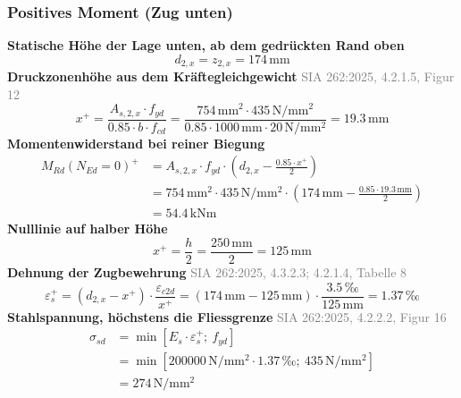 \documentclass[11pt,a4paper]{article}
\newcommand{\normref}[1]{{\small\textcolor{gray}{#1}}}
\begin{document}
\subsubsection{Positives Moment (Zug unten)}
\noindent\textbf{Statische Höhe der Lage unten, ab dem gedrückten Rand oben}
\begin{equation*}
d_{2,x} = z_{2,x} = 174\,\mathrm{mm}
\end{equation*}
\noindent\textbf{Druckzonenhöhe aus dem Kräftegleichgewicht} \hfill \normref{SIA 262:2025, 4.2.1.5, Figur 12}
\begin{equation*}
x^{+} = \frac{A_{s,2,x} \cdot f_{yd}}{0.85 \cdot b \cdot f_{cd}} = \frac{754\,\mathrm{mm}^{2} \cdot 435\,\mathrm{N}/\mathrm{mm}^{2}}{0.85 \cdot 1000\,\mathrm{mm} \cdot 20\,\mathrm{N}/\mathrm{mm}^{2}} = 19.3\,\mathrm{mm}
\end{equation*}
\noindent\textbf{Momentenwiderstand bei reiner Biegung}
\begin{equation*}
\begin{aligned}
  M_{Rd}(N_{Ed}=0)^{+} &= A_{s,2,x} \cdot f_{yd} \cdot \left(d_{2,x} - \frac{0.85 \cdot x^{+}}{2}\right) \\
  &= 754\,\mathrm{mm}^{2} \cdot 435\,\mathrm{N}/\mathrm{mm}^{2} \cdot \left(174\,\mathrm{mm} - \frac{0.85 \cdot 19.3\,\mathrm{mm}}{2}\right) \\
  &= 54.4\,\mathrm{kNm}
\end{aligned}
\end{equation*}
\noindent\textbf{Nulllinie auf halber Höhe}
\begin{equation*}
x^{+} = \frac{h}{2} = \frac{250\,\mathrm{mm}}{2} = 125\,\mathrm{mm}
\end{equation*}
\noindent\textbf{Dehnung der Zugbewehrung} \hfill \normref{SIA 262:2025, 4.3.2.3; 4.2.1.4, Tabelle 8}
\begin{equation*}
\varepsilon_s^{+} = \left(d_{2,x} - x^{+}\right) \cdot \frac{\varepsilon_{c2d}}{x^{+}} = \left(174\,\mathrm{mm} - 125\,\mathrm{mm}\right) \cdot \frac{3.5\,\text{‰}}{125\,\mathrm{mm}} = 1.37\,\text{‰}
\end{equation*}
\noindent\textbf{Stahlspannung, höchstens die Fliessgrenze} \hfill \normref{SIA 262:2025, 4.2.2.2, Figur 16}
\begin{equation*}
\begin{aligned}
  \sigma_{sd} &= \min\left[E_s \cdot \varepsilon_s^{+};\ f_{yd}\right] \\
  &= \min\left[200000\,\mathrm{N}/\mathrm{mm}^{2} \cdot 1.37\,\text{‰};\ 435\,\mathrm{N}/\mathrm{mm}^{2}\right] \\
  &= 274\,\mathrm{N}/\mathrm{mm}^{2}
\end{aligned}
\end{equation*}
\end{document}

